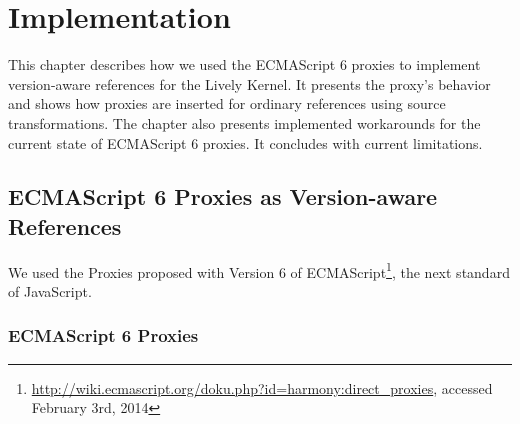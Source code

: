 

\chapter{Implementation} \label{chapter:IMPLEMENTATION}

This chapter describes how we used the ECMAScript 6 proxies to implement version-aware references for the Lively Kernel.
It presents the proxy's behavior and shows how proxies are inserted for ordinary references using source transformations.
The chapter also presents implemented workarounds for the current state of ECMAScript 6 proxies.
It concludes with current limitations.


\section{ECMAScript 6 Proxies as Version-aware References} \label{sec:IMPLEMENTATION:1}

We used the Proxies proposed with Version 6 of ECMAScript\footnote{\url{http://wiki.ecmascript.org/doku.php?id=harmony:direct_proxies}, accessed February 3rd, 2014}, the next standard of JavaScript.

\subsection{ECMAScript 6 Proxies}

    
    
    







